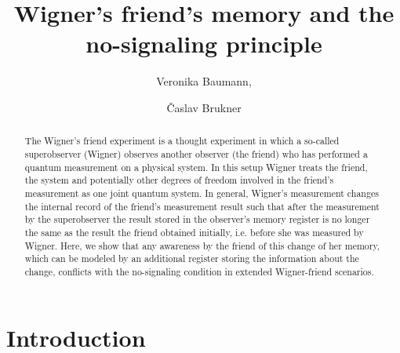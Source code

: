 \documentclass[a4paper,twocolumn,11pt,accepted=2017-05-09,dvipsnames]{quantumarticle}
\numberwithin{equation}{section}
\begin{document}
\title{Wigner’s friend’s memory and the no-signaling principle}

\author{Veronika Baumann,}
    
\author{\v{C}aslav Brukner}


\begin{abstract}

The Wigner's friend experiment is a thought experiment in which a so-called superobserver (Wigner) observes another observer (the friend) who has performed a quantum measurement on a physical system. In this setup Wigner treats the friend, the system and potentially other degrees of freedom involved in the friend's measurement as one joint quantum system.
In general, Wigner's measurement changes the internal record of the friend's measurement result such that after the measurement by the superobserver the result stored in the observer's memory register is no longer the same as the result the friend obtained initially, i.e. before she was measured by Wigner. Here, we show that any awareness by the friend of this change of her memory, which can be modeled by an additional register storing the information about the change, conflicts with the no-signaling condition in extended Wigner-friend scenarios. \\
\end{abstract}

\maketitle

\section{Introduction}
\label{introduction}
\end{document}
